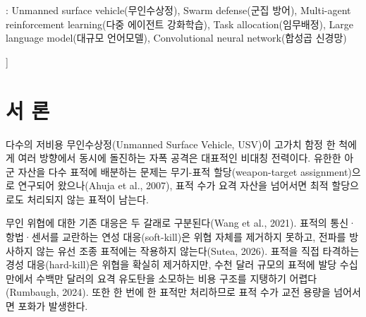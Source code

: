 \documentclass[10pt,twocolumn]{extarticle}
\newcommand{\guide}[1]{\textcolor{snakred}{#1}}   %
\newcommand{\snakkeywords}[1]{%
  \par\fontsize{9}{13.5}\selectfont\setlength{\parindent}{0pt}
  \noindent{\bfseries Keywords} : \guide{#1}\par}
\begin{document}
\begin{@twocolumnfalse}
\vspace{7.3mm}

\snakkeywords{Unmanned surface vehicle(무인수상정),
Swarm defense(군집 방어), Multi-agent reinforcement learning(다중 에이전트 강화학습),
Task allocation(임무배정), Large language model(대규모 언어모델),
Convolutional neural network(합성곱 신경망)}

\vspace{16mm}

\end{@twocolumnfalse}
]

\section{서 론}


다수의 저비용 무인수상정(Unmanned Surface Vehicle, USV)이 고가치 함정 한 척에게 여러
방향에서 동시에 돌진하는 자폭 공격은 대표적인 비대칭 전력이다. 유한한 아군 자산을 다수
표적에 배분하는 문제는 무기-표적 할당(weapon-target assignment)으로 연구되어
왔으나(Ahuja et al., 2007), 표적 수가 요격 자산을 넘어서면 최적 할당으로도 처리되지 않는
표적이 남는다.

무인 위협에 대한 기존 대응은 두 갈래로 구분된다(Wang et al., 2021). 표적의
통신·항법·센서를 교란하는 연성 대응(soft-kill)은 위협 자체를 제거하지 못하고, 전파를
방사하지 않는 유선 조종 표적에는 작용하지 않는다(Sutea, 2026). 표적을 직접 타격하는 경성 대응(hard-kill)은 위협을 확실히
제거하지만, 수천 달러 규모의 표적에 발당 수십만에서 수백만 달러의 요격 유도탄을
소모하는 비용 구조를 지탱하기 어렵다(Rumbaugh, 2024). 또한 한 번에 한 표적만 처리하므로
표적 수가 교전 용량을 넘어서면 포화가 발생한다.
\end{document}
